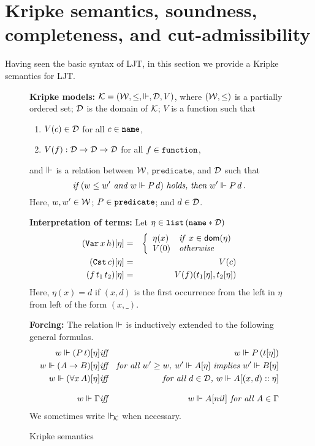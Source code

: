 \documentclass{kms-j}
\theoremstyle{plain}
\theoremstyle{remark}
\begin{document}
\section{Kripke semantics, soundness, completeness, and cut-admissibility}\label{sec:kripke}
Having seen the basic syntax of LJT, in this section we provide a Kripke semantics for LJT.
%
\begin{figure}[t]
\raggedright
\textbf{Kripke models:} ${\mathcal K} = ({\mathcal W}, \le,\Vdash , {\mathcal D}, V )$, where $({\mathcal W}, \le)$ is a partially ordered set; ${\mathcal D}$ is the domain of ${\mathcal K}$; $V$ is a function such that
\begin{enumerate}
\item $V(c) \in {\mathcal D}$ for all $c \in \textup{\tt name}$,
\item $V(f) : {\mathcal D} \to {\mathcal D} \to {\mathcal D}$ for all $f \in \textup{\tt function}$,
\end{enumerate}
and $\Vdash$ is a relation between ${\mathcal W}$, $\texttt{predicate}$, and ${\mathcal D}$
such that
\[
\textit{if}\,\, (w \le w' \textit{ and } w \Vdash P\,
d)\,\,\textit{holds,}
\,\,\textit{then}\,\, w' \Vdash P\,d\,.
\]
Here, $w, w' \in {\mathcal W}$; $P \in \textup{\tt predicate}$; and $d \in {\mathcal D}$.\medskip

\textbf{Interpretation of terms:} Let $\eta \in \textup{\tt list}\, (\textup{\tt name} \ast {\mathcal D})$
\begin{eqnarray}
  (\textup{\tt Var}\, x\, h) [\eta] & = &
  \left \{
  \begin{array}{ll}
    \eta(x) & \textit{if }\, x\in \mathrm{\textsf{dom}}(\eta)\\
    V(0) & \textit{otherwise}
  \end{array}
  \nonumber \right . \\
  (\textup{\tt Cst}\, c) [\eta] & = & V(c) \nonumber\\
  (f\, t_1\, t_2 ) [\eta] & = & V(f)(t_1 [\eta], t_2 [\eta])\nonumber
\end{eqnarray}
Here, $\eta(x) = d$ if $(x,d)$ is the first occurrence from the left  in $\eta$ from left
of the form $(x, \_)$.\medskip

\textbf{Forcing:} The relation $\Vdash$ is inductively extended to the
following general formulas.
\begin{eqnarray}
  w \Vdash (P\, t)[\eta] & \textit{iff} & w \Vdash P\, (t[\eta]) \nonumber\\
  w \Vdash (A \to B)[\eta] & \textit{iff} & \textit{for all $w' \ge w$, $w' \Vdash A [\eta]$ implies $w' \Vdash B[\eta]$} \nonumber\\
  w \Vdash (\forall x\,  A)[\eta] & \textit{iff} & \textit{for all $d \in {\mathcal D}$, $w\Vdash A [(x, d) :: \eta]$} \nonumber \\[2ex]
  w \Vdash \Gamma & \textit{iff} & \textit{$w \Vdash A [nil]$ for all $A \in \Gamma$} \nonumber
\end{eqnarray}
We sometimes write $\Vdash_{\!{\mathcal K}}$ when necessary.

\hrulefill
  \caption{Kripke semantics}
  \label{fig:kripke}
\end{figure}
\end{document}
